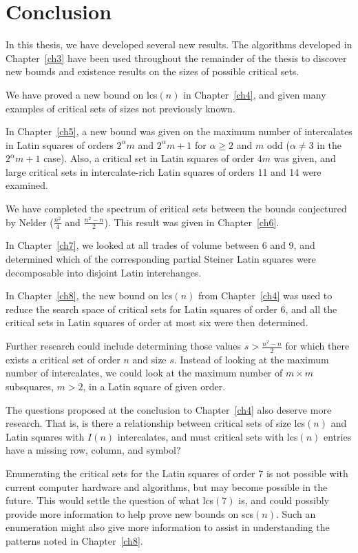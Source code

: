 \documentclass[12pt]{report}
\def\lcs#1{{\rm lcs}$(#1)$}
\def\scs#1{{\rm scs}$(#1)$}
\begin{document}
\chapter{Conclusion}\label{ch9}
In this thesis, we have developed several new results.  The algorithms
developed in Chapter~\ref{ch3} have been used throughout the remainder of the
thesis to discover new bounds and existence results on the sizes of
possible critical sets.

We have proved a new bound on \lcs{n} in Chapter~\ref{ch4}, and given many
examples of critical sets of sizes not previously known.

In Chapter~\ref{ch5}, a new bound was given on the maximum number of intercalates
in Latin squares of orders $2^\alpha m$ and $2^\alpha m+1$ for $\alpha
\geq 2$ and $m$ odd ($\alpha \neq 3$ in the $2^\alpha m+1$ case).  Also, a
critical set in Latin squares of order $4m$ was given, and large critical
sets in intercalate-rich Latin squares of orders 11 and 14 were examined.

We have completed the spectrum of critical sets between the bounds
conjectured by Nelder ($\displaystyle{\frac{n^2}{4}}$ and $\displaystyle{\frac{n^2-n}{2}}$).
This result was given in Chapter~\ref{ch6}.

In Chapter~\ref{ch7}, we looked at all trades of volume between 6 and 9, and
determined which of the corresponding partial Steiner Latin squares were
decomposable into disjoint Latin interchanges.

In Chapter~\ref{ch8}, the new bound on lcs$(n)$ from Chapter~\ref{ch4} was used to
reduce the search space of critical sets for Latin squares of order 6,
and all the critical sets in Latin squares of order at most six were
then determined.

Further research could include determining those values $s >
\displaystyle{\frac{n^{2}-n}{2}}$ for which there exists a critical set of order $n$
and size $s$.  Instead of looking at the maximum number of intercalates,
we could look at the maximum number of $m \times m$ subsquares, $m > 
2$, in a Latin square of given order.

The questions proposed at the conclusion to Chapter~\ref{ch4} also deserve more
research.  That is, is there a relationship between critical sets of 
size \lcs{n} and Latin
squares with $I(n)$ intercalates, and must critical sets with \lcs{n}
entries have a missing row, column, and symbol?

Enumerating the critical sets for the Latin squares of order 7 is not
possible with current computer hardware and algorithms, but may become
possible in the future.  This would settle the question of what \lcs7
is, and could possibly provide more information to help prove new bounds
on \scs{n}.  Such an enumeration might also give more information to
assist in understanding the patterns noted in Chapter~\ref{ch8}.
\end{document}
